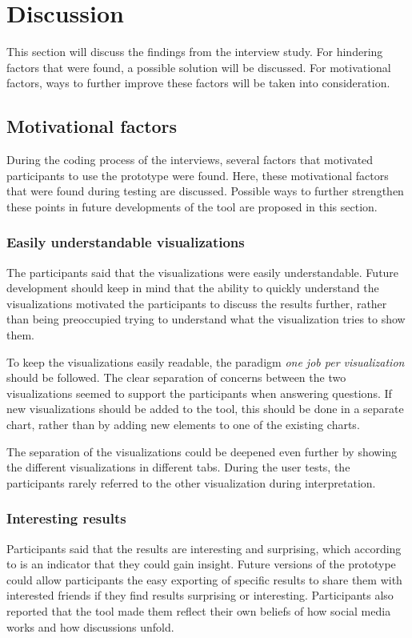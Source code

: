 \section{Discussion}
This section will discuss the findings from the interview study. For hindering factors that were found, a possible solution will be discussed. For motivational factors, ways to further improve these factors will be taken into consideration.

\subsection{Motivational factors}
During the coding process of the interviews, several factors that motivated participants to use the prototype were found. Here, these motivational factors that were found during testing are discussed. Possible ways to further strengthen these points in future developments of the tool are proposed in this section.

\subsubsection*{Easily understandable visualizations}
The participants said that the visualizations were easily understandable. Future development should keep in mind that the ability to quickly understand the visualizations motivated the participants to discuss the results further, rather than being preoccupied trying to understand what the visualization tries to show them.

To keep the visualizations easily readable, the paradigm \emph{one job per visualization} should be followed. The clear separation of concerns between the two visualizations seemed to support the participants when answering questions. If new visualizations should be added to the tool, this should be done in a separate chart, rather than by adding new elements to one of the existing charts.

The separation of the visualizations could be deepened even further by showing the different visualizations in different tabs. During the user tests, the participants rarely referred to the other visualization during interpretation.

\subsubsection*{Interesting results}
Participants said that the results are interesting and surprising, which according to \citeauthor{northMeasuringVisualizationInsight2006} is an indicator that they could gain insight. Future versions of the prototype could allow participants the easy exporting of specific results to share them with interested friends if they find results surprising or interesting. Participants also reported that the tool made them reflect their own beliefs of how social media works and how discussions unfold.

